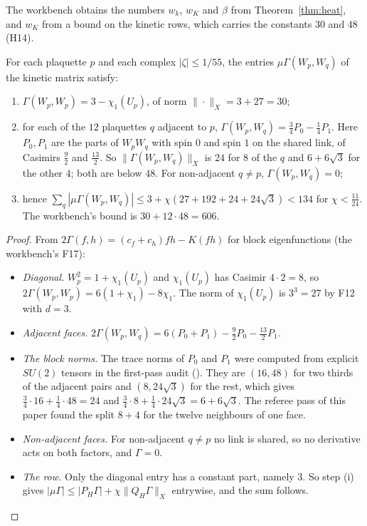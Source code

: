 The workbench obtains the numbers $w_k$, $w_K$ and $\beta$ from Theorem~\ref{thm:heat}, and $w_K$ from a bound on the kinetic rows, which carries the constants $30$ and $48$ (H14).

\begin{proposition}\label{prop:kinetic}
For each plaquette $p$ and each complex $|\zeta|\le1/55$, the entries $\mu\Gamma(W_p,W_q)$ of the kinetic matrix satisfy:
\begin{enumerate}[label=(\alph*)]
\item $\Gamma(W_p,W_p)=3-\chi_1(U_p)$, of norm $\|\cdot\|_X=3+27=30$;
\item for each of the $12$ plaquettes $q$ adjacent to $p$, $\Gamma(W_p,W_q)=\frac34P_0-\frac14P_1$. Here $P_0,P_1$ are the parts of $W_pW_q$ with spin $0$ and spin $1$ on the shared link, of Casimirs $\frac92$ and $\frac{13}2$. So $\|\Gamma(W_p,W_q)\|_X$ is $24$ for $8$ of the $q$ and $6+6\sqrt3$ for the other $4$; both are below $48$. For non-adjacent $q\ne p$, $\Gamma(W_p,W_q)=0$;
\item hence $\sum_q|\mu\Gamma(W_p,W_q)|\le3+\chi(27+192+24+24\sqrt3)<134$ for $\chi<\frac{11}{24}$. The workbench's bound is $30+12\cdot48=606$.
\end{enumerate}
\end{proposition}
\begin{proof}
From $2\Gamma(f,h)=(c_f+c_h)fh-K(fh)$ for block eigenfunctions (the workbench's F17):
\begin{itemize}
\item \emph{Diagonal.} $W_p^2=1+\chi_1(U_p)$ and $\chi_1(U_p)$ has Casimir $4\cdot2=8$, so $2\Gamma(W_p,W_p)=6(1+\chi_1)-8\chi_1$. The norm of $\chi_1(U_p)$ is $3^3=27$ by F12 with $d=3$.
\item \emph{Adjacent faces.} $2\Gamma(W_p,W_q)=6(P_0+P_1)-\frac92P_0-\frac{13}2P_1$.
\item \emph{The block norms.} The trace norms of $P_0$ and $P_1$ were computed from explicit $SU(2)$ tensors in the first-pass audit (). They are $(16,48)$ for two thirds of the adjacent pairs and $(8,24\sqrt3)$ for the rest, which gives $\frac34\cdot16+\frac14\cdot48=24$ and $\frac34\cdot8+\frac14\cdot24\sqrt3=6+6\sqrt3$. The referee pass of this paper found the split $8+4$ for the twelve neighbours of one face.
\item \emph{Non-adjacent faces.} For non-adjacent $q\ne p$ no link is shared, so no derivative acts on both factors, and $\Gamma=0$.
\item \emph{The row.} Only the diagonal entry has a constant part, namely $3$. So step (i) gives $|\mu\Gamma|\le|P_H\Gamma|+\chi\|Q_H\Gamma\|_X$ entrywise, and the sum follows.
\end{itemize}
\end{proof}
